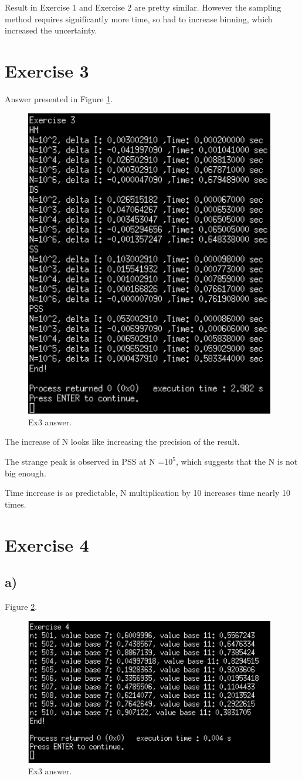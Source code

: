 \documentclass{article}
\begin{document}
Result in Exercise 1 and Exercise 2 are pretty similar. However the sampling method requires significantly more time, so had to increase binning, which increased the uncertainty.

\clearpage

\section{Exercise 3}
Answer presented in Figure \ref{fig:ex3_answer}.
\begin{figure}[!hbt]
	\centering
	\includegraphics[width=4.3in]{ex3_answer}
	\caption{Ex3 answer.}
	\label{fig:ex3_answer}
\end{figure}

The increase of N looks like increasing the precision of the result.

The strange peak is observed in PSS at N =$10^5$, which suggests that the N is not big enough.

Time increase is as predictable, N multiplication by 10 increases time nearly 10 times.

\clearpage
\section{Exercise 4}
\subsection{a)}
Figure \ref{fig:ex4a_answer}.
\begin{figure}[!hbt]
	\centering
	\includegraphics[width=4.3in]{ex4a_answer}
	\caption{Ex3 answer.}
	\label{fig:ex4a_answer}
\end{figure}
\end{document}
